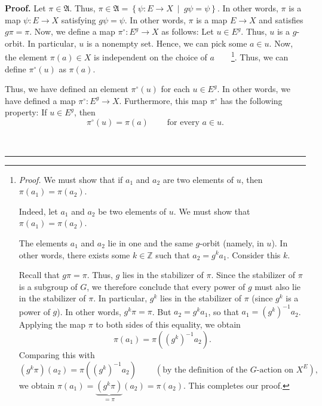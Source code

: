 \documentclass[numbers=enddot,12pt,final,onecolumn,notitlepage,abstracton]{scrartcl}
\theoremstyle{definition}
\newenvironment{proof}[1][Proof]{\noindent\textbf{#1.} }{\ \rule{0.5em}{0.5em}}
\newenvironment{verlong}{}{}
\begin{document}
\begin{verlong}
\begin{proof}
Let $\pi\in\mathfrak{A}$. Thus, $\pi\in\mathfrak{A}=\left\{  \psi:E\rightarrow
X\ \mid\ g\psi=\psi\right\}  $. In other words, $\pi$ is a map $\psi
:E\rightarrow X$ satisfying $g\psi=\psi$. In other words, $\pi$ is a map
$E\rightarrow X$ and satisfies $g\pi=\pi$. Now, we define a map $\pi^{\circ
}:E^{g}\rightarrow X$ as follows: Let $u\in E^{g}$. Thus, $u$ is a $g$-orbit.
In particular, $u$ is a nonempty set. Hence, we can pick some $a\in u$. Now,
the element $\pi\left(  a\right)  \in X$ is independent on the choice of
$a$\ \ \ \ \footnote{\textit{Proof.} We must show that if $a_{1}$ and $a_{2}$
are two elements of $u$, then $\pi\left(  a_{1}\right)  =\pi\left(
a_{2}\right)  $.
\par
Indeed, let $a_{1}$ and $a_{2}$ be two elements of $u$. We must show that
$\pi\left(  a_{1}\right)  =\pi\left(  a_{2}\right)  $.
\par
The elements $a_{1}$ and $a_{2}$ lie in one and the same $g$-orbit (namely, in
$u$). In other words, there exists some $k\in\mathbb{Z}$ such that
$a_{2}=g^{k}a_{1}$. Consider this $k$.
\par
Recall that $g\pi=\pi$. Thus, $g$ lies in the stabilizer of $\pi$. Since the
stabilizer of $\pi$ is a subgroup of $G$, we therefore conclude that every
power of $g$ must also lie in the stabilizer of $\pi$. In particular, $g^{k}$
lies in the stabilizer of $\pi$ (since $g^{k}$ is a power of $g$). In other
words, $g^{k}\pi=\pi$. But $a_{2}=g^{k}a_{1}$, so that $a_{1}=\left(
g^{k}\right)  ^{-1}a_{2}$. Applying the map $\pi$ to both sides of this
equality, we obtain
\[
\pi\left(  a_{1}\right)  =\pi\left(  \left(  g^{k}\right)  ^{-1}a_{2}\right)
.
\]
Comparing this with%
\[
\left(  g^{k}\pi\right)  \left(  a_{2}\right)  =\pi\left(  \left(
g^{k}\right)  ^{-1}a_{2}\right)  \ \ \ \ \ \ \ \ \ \ \left(  \text{by the
definition of the }G\text{-action on }X^{E}\right)  ,
\]
we obtain $\pi\left(  a_{1}\right)  =\underbrace{\left(  g^{k}\pi\right)
}_{=\pi}\left(  a_{2}\right)  =\pi\left(  a_{2}\right)  $. This completes our
proof.}. Thus, we can define $\pi^{\circ}\left(  u\right)  $ as $\pi\left(
a\right)  $.

Thus, we have defined an element $\pi^{\circ}\left(  u\right)  $ for each
$u\in E^{g}$. In other words, we have defined a map $\pi^{\circ}%
:E^{g}\rightarrow X$. Furthermore, this map $\pi^{\circ}$ has the following
property: If $u\in E^{g}$, then%
\begin{equation}
\pi^{\circ}\left(  u\right)  =\pi\left(  a\right)
\ \ \ \ \ \ \ \ \ \ \text{for every }a\in u.\label{pf.prop.G-set.quot.Phi.1}%
\end{equation}



\end{proof}
\end{verlong}
\end{document}
